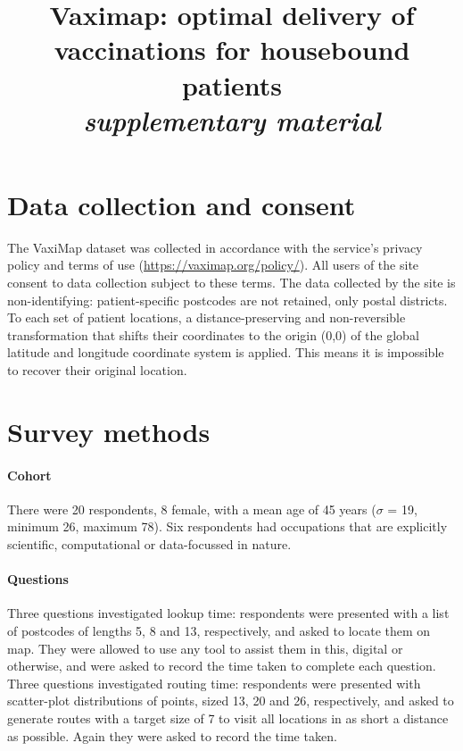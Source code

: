 \documentclass[review]{elsarticle}
\def\vm{VaxiMap}
\begin{document}
\linenumbers

\title{Vaximap: optimal delivery of vaccinations for housebound patients\\
\textit{supplementary material}}
\maketitle

\section{Data collection and consent}

The \vm{} dataset was collected in accordance with the service's privacy policy and terms of use (\hyperlink{https://vaximap.org/policy/}{https://vaximap.org/policy/}). All users of the site consent to data collection subject to these terms. The data collected by the site is non-identifying: patient-specific postcodes are not retained, only postal districts. To each set of patient locations, a distance-preserving and non-reversible transformation that shifts their coordinates to the origin (0,0) of the global latitude and longitude coordinate system is applied. This means it is impossible to recover their original location. 

\section{Survey methods}

\paragraph{Cohort} There were 20 respondents, 8 female, with a mean age of 45 years ($\sigma$ = 19, minimum 26, maximum 78). Six respondents had occupations that are explicitly scientific, computational or data-focussed in nature. 

\paragraph{Questions} Three questions investigated lookup time: respondents were presented with a list of postcodes of lengths 5, 8 and 13, respectively, and asked to locate them on map. They were allowed to use any tool to assist them in this, digital or otherwise, and were asked to record the time taken to complete each question. Three questions investigated routing time: respondents were presented with scatter-plot distributions of points, sized 13, 20 and 26, respectively, and asked to generate routes with a target size of 7 to visit all locations in as short a distance as possible. Again they were asked to record the time taken.
\end{document}
